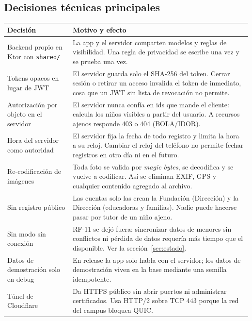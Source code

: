 \subsection{Decisiones técnicas principales}
\begin{longtable}{p{3.6cm}p{11.4cm}}
\toprule
\textbf{Decisión} & \textbf{Motivo y efecto}\\\midrule\endhead
Backend propio en Ktor con \texttt{shared/\allowbreak{}} & La app y el servidor comparten modelos y reglas de visibilidad. Una regla de privacidad se escribe una vez y se prueba una vez.\\
Tokens opacos en lugar de JWT & El servidor guarda solo el SHA-256 del token. Cerrar sesión o retirar un acceso invalida el token de inmediato, cosa que un JWT sin lista de revocación no permite.\\
Autorización por objeto en el servidor & El servidor nunca confía en ids que mande el cliente: calcula los niños visibles a partir del usuario. A recursos ajenos responde 403 o 404 (BOLA/IDOR).\\
Hora del servidor como autoridad & El servidor fija la fecha de todo registro y limita la hora a su reloj. Cambiar el reloj del teléfono no permite fechar registros en otro día ni en el futuro.\\
Re-codificación de imágenes & Toda foto se valida por \emph{magic bytes}, se decodifica y se vuelve a codificar. Así se eliminan EXIF, GPS y cualquier contenido agregado al archivo.\\
Sin registro público & Las cuentas solo las crean la Fundación (Dirección) y la Dirección (educadoras y familias). Nadie puede hacerse pasar por tutor de un niño ajeno.\\
Sin modo sin conexión & RF-11 se dejó fuera: sincronizar datos de menores sin conflictos ni pérdida de datos requería más tiempo que el disponible. Ver la sección~\ref{sec:estado}.\\
Datos de demostración solo en debug & En release la app solo habla con el servidor; los datos de demostración viven en la base mediante una semilla idempotente.\\
Túnel de Cloudflare & Da HTTPS público sin abrir puertos ni administrar certificados. Usa HTTP/2 sobre TCP 443 porque la red del campus bloquea QUIC.\\
\bottomrule
\end{longtable}
